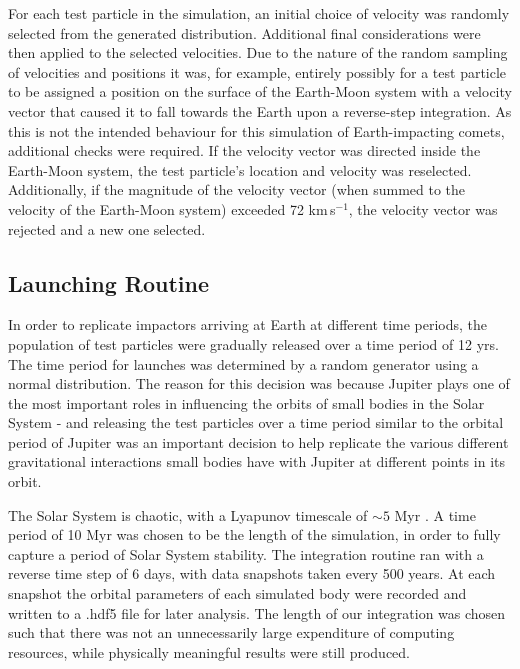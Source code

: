 For each test particle in the simulation, an initial choice of velocity was randomly selected from the generated distribution. Additional final considerations were then applied to the selected velocities. Due to the nature of the random sampling of velocities and positions it was, for example, entirely possibly for a test particle to be assigned a position on the surface of the Earth-Moon system with a velocity vector that caused it to fall towards the Earth upon a reverse-step integration. As this is not the intended behaviour for this simulation of Earth-impacting comets, additional checks were required. If the velocity vector was directed inside the Earth-Moon system, the test particle's location and velocity was reselected. Additionally, if the magnitude of the velocity vector (when summed to the velocity of the Earth-Moon system) exceeded 72 km$\,$s$^{-1}$, the velocity vector was rejected and a new one selected.

\clearpage
\subsection{Launching Routine}

In order to replicate impactors arriving at Earth at different time periods, the population of test particles were gradually released over a time period of 12 yrs. The time period for launches was determined by a random generator using a normal distribution.  The reason for this decision was because Jupiter plays one of the most important roles in influencing the orbits of small bodies in the Solar System - and releasing the test particles over a time period similar to the orbital period of Jupiter was an important decision to help replicate the various different gravitational interactions small bodies have with Jupiter at different points in its orbit.

The Solar System is chaotic, with a Lyapunov timescale of $\sim 5$ Myr \citep{1996CeMDA..64..115L}. A time period of 10 Myr was chosen to be the length of the simulation, in order to fully capture a period of Solar System stability. The integration routine ran with a reverse time step of 6 days, with data snapshots taken every 500 years. At each snapshot the orbital parameters of each simulated body were recorded and written to a .hdf5 file for later analysis. The length of our integration was chosen such that there was not an unnecessarily large expenditure of computing resources, while physically meaningful results were still produced.


